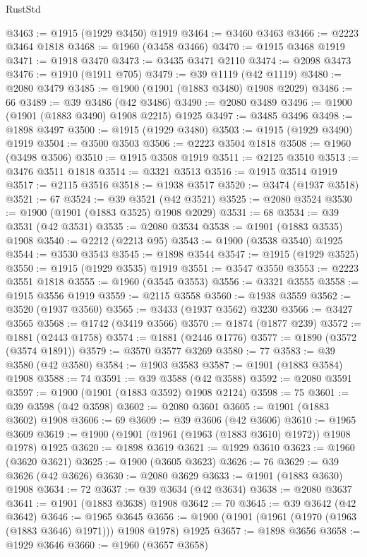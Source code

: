 \begin{lexlean}{RustStd}
\begin{coremodule}
@3463 := @1915 (@1929 @3450) @1919
@3464 := @3460 @3463
@3466 := @2223 @3464 @1818
@3468 := @1960 (@3458 @3466)
@3470 := @1915 @3468 @1919
@3471 := @1918 @3470
@3473 := @3435 @3471 @2110
@3474 := @2098 @3473
@3476 := @1910 (@1911 @705)
@3479 := @39 @1119 (@42 @1119)
@3480 := @2080 @3479
@3485 := @1900 (@1901 (@1883 @3480) @1908 @2029)
@3486 := 66
@3489 := @39 @3486 (@42 @3486)
@3490 := @2080 @3489
@3496 := @1900 (@1901 (@1883 @3490) @1908 @2215) @1925
@3497 := @3485 @3496
@3498 := @1898 @3497
@3500 := @1915 (@1929 @3480)
@3503 := @1915 (@1929 @3490) @1919
@3504 := @3500 @3503
@3506 := @2223 @3504 @1818
@3508 := @1960 (@3498 @3506)
@3510 := @1915 @3508 @1919
@3511 := @2125 @3510
@3513 := @3476 @3511 @1818
@3514 := @3321 @3513
@3516 := @1915 @3514 @1919
@3517 := @2115 @3516
@3518 := @1938 @3517
@3520 := @3474 (@1937 @3518)
@3521 := 67
@3524 := @39 @3521 (@42 @3521)
@3525 := @2080 @3524
@3530 := @1900 (@1901 (@1883 @3525) @1908 @2029)
@3531 := 68
@3534 := @39 @3531 (@42 @3531)
@3535 := @2080 @3534
@3538 := @1901 (@1883 @3535) @1908
@3540 := @2212 (@2213 @95)
@3543 := @1900 (@3538 @3540) @1925
@3544 := @3530 @3543
@3545 := @1898 @3544
@3547 := @1915 (@1929 @3525)
@3550 := @1915 (@1929 @3535) @1919
@3551 := @3547 @3550
@3553 := @2223 @3551 @1818
@3555 := @1960 (@3545 @3553)
@3556 := @3321 @3555
@3558 := @1915 @3556 @1919
@3559 := @2115 @3558
@3560 := @1938 @3559
@3562 := @3520 (@1937 @3560)
@3565 := @3433 (@1937 @3562) @3230
@3566 := @3427 @3565
@3568 := @1742 (@3419 @3566)
@3570 := @1874 (@1877 @239)
@3572 := @1881 (@2443 @1758)
@3574 := @1881 (@2446 @1776)
@3577 := @1890 (@3572 (@3574 @1891))
@3579 := @3570 @3577 @3269
@3580 := 77
@3583 := @39 @3580 (@42 @3580)
@3584 := @1903 @3583
@3587 := @1901 (@1883 @3584) @1908
@3588 := 74
@3591 := @39 @3588 (@42 @3588)
@3592 := @2080 @3591
@3597 := @1900 (@1901 (@1883 @3592) @1908 @2124)
@3598 := 75
@3601 := @39 @3598 (@42 @3598)
@3602 := @2080 @3601
@3605 := @1901 (@1883 @3602) @1908
@3606 := 69
@3609 := @39 @3606 (@42 @3606)
@3610 := @1965 @3609
@3619 := @1900 (@1901 (@1961 (@1963 (@1883 @3610) @1972)) @1908 @1978) @1925
@3620 := @1898 @3619
@3621 := @1929 @3610
@3623 := @1960 (@3620 @3621)
@3625 := @1900 (@3605 @3623)
@3626 := 76
@3629 := @39 @3626 (@42 @3626)
@3630 := @2080 @3629
@3633 := @1901 (@1883 @3630) @1908
@3634 := 72
@3637 := @39 @3634 (@42 @3634)
@3638 := @2080 @3637
@3641 := @1901 (@1883 @3638) @1908
@3642 := 70
@3645 := @39 @3642 (@42 @3642)
@3646 := @1965 @3645
@3656 := @1900 (@1901 (@1961 (@1970 (@1963 (@1883 @3646) @1971))) @1908 @1978) @1925
@3657 := @1898 @3656
@3658 := @1929 @3646
@3660 := @1960 (@3657 @3658)

\end{coremodule}
\end{lexlean}

